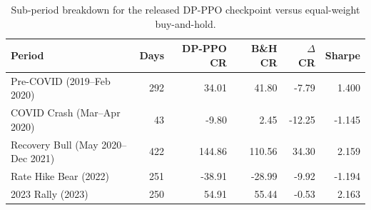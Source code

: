 \begin{table}[htbp]
\centering
\caption{Sub-period breakdown for the released DP-PPO checkpoint versus equal-weight buy-and-hold.}
\label{tab:subperiod}
\begin{tabular}{lrrrrr}
\toprule
\textbf{Period} & \textbf{Days} & \textbf{DP-PPO CR} & \textbf{B\&H CR} & \textbf{$\Delta$ CR} & \textbf{Sharpe} \\
\midrule
Pre-COVID (2019–Feb 2020) & 292 & 34.01 & 41.80 & -7.79 & 1.400 \\
COVID Crash (Mar–Apr 2020) & 43 & -9.80 & 2.45 & -12.25 & -1.145 \\
Recovery Bull (May 2020–Dec 2021) & 422 & 144.86 & 110.56 & 34.30 & 2.159 \\
Rate Hike Bear (2022) & 251 & -38.91 & -28.99 & -9.92 & -1.194 \\
2023 Rally (2023) & 250 & 54.91 & 55.44 & -0.53 & 2.163 \\
\bottomrule
\end{tabular}
\end{table}

